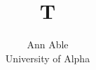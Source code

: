 \documentclass{article}
\begin{document}
\title{T}
\author{\parbox{\linewidth}{\centering Ann Able \\ University of Alpha}}
\maketitle
\end{document}
